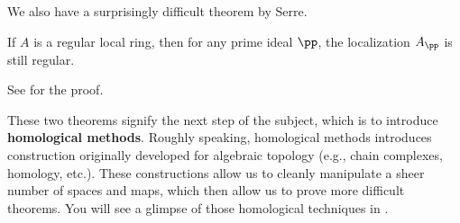 We also have a surprisingly difficult theorem by Serre.
\begin{theorem}[Serre]
    If $A$ is a regular local ring,
    then for any prime ideal $\pp$, the localization
    $A_\pp$ is still regular.
\end{theorem}
See \cite[Cor. 19.14]{eisenbud} for the proof.

These two theorems signify the next step of the subject,
which is to introduce \textbf{homological methods}.
Roughly speaking, homological methods introduces 
construction originally developed for algebraic topology
(e.g., chain complexes, homology, etc.).
These constructions allow us to cleanly manipulate
a sheer number of spaces and maps,
which then allow us to prove more difficult theorems.
You will see a glimpse of those homological techniques
in .

